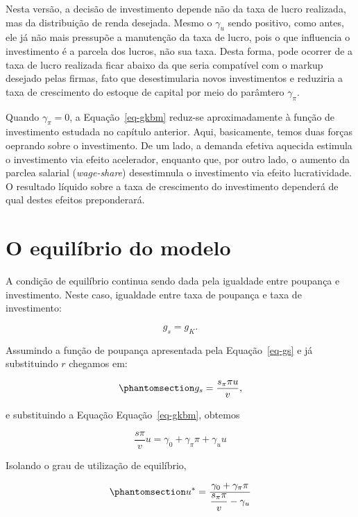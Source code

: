 \documentclass[
  brazilian,
  letterpaper,
  DIV=11,
  numbers=noendperiod]{scrreprt}
\begin{document}
Nesta versão, a decisão de investimento depende não da taxa de lucro
realizada, mas da distribuição de renda desejada. Mesmo o \(\gamma_u\)
sendo positivo, como antes, ele já não mais pressupõe a manutenção da
taxa de lucro, pois o que influencia o investimento é a parcela dos
lucros, não sua taxa. Desta forma, pode ocorrer de a taxa de lucro
realizada ficar abaixo da que seria compatível com o markup desejado
pelas firmas, fato que desestimularia novos investimentos e reduziria a
taxa de crescimento do estoque de capital por meio do parâmtero
\(\gamma_\pi\).

Quando \(\gamma_{\pi}=0\), a Equação~\ref{eq-gkbm} reduz-se
aproximadamente à função de investimento estudada no capítulo anterior.
Aqui, basicamente, temos duas forças oeprando sobre o investimento. De
um lado, a demanda efetiva aquecida estimula o investimento via efeito
acelerador, enquanto que, por outro lado, o aumento da parclea salarial
(\emph{wage-share}) desestimnula o investimento via efeito
lucratividade. O resultado líquido sobre a taxa de crescimento do
investimento dependerá de qual destes efeitos preponderará.

\section{O equilíbrio do modelo}\label{sec-equilibrio-bm}

A condição de equilíbrio continua sendo dada pela igualdade entre
poupança e investimento. Neste caso, igualdade entre taxa de poupança e
taxa de investimento:

\[g_{s}=g_{K}.\]

Assumindo a função de poupança apresentada pela Equação~\ref{eq-gs} e já
substituindo \(r\) chegamos em:

\begin{equation}\protect\phantomsection\label{eq-gs-bm}{g_s=\frac{s_\pi\pi u}{v},}\end{equation}

e substituindo a Equação Equação~\ref{eq-gkbm}, obtemos

\[\frac{s\pi}{v}u=\gamma_0+\gamma_{\pi}\pi+\gamma_u u\]

Isolando o grau de utilização de equilíbrio,

\begin{equation}\protect\phantomsection\label{eq-u-bm}{u^{*}=\frac{\gamma_0+\gamma_{\pi}\pi}{\dfrac{s_\pi \pi}{v}-\gamma_u}}\end{equation}
\end{document}
